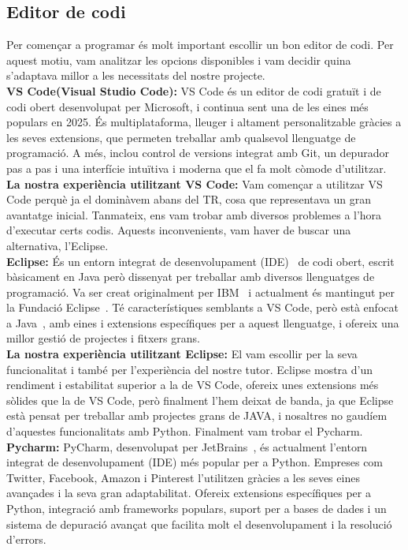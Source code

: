 \subsection{Editor de codi}
Per començar a programar és molt important escollir un bon editor de codi. Per aquest motiu, vam analitzar les opcions disponibles i vam decidir quina s’adaptava millor a les necessitats del nostre projecte.\\

\textbf{VS Code(Visual Studio Code): }
VS Code és un editor de codi gratuït i de codi obert desenvolupat per Microsoft, i continua sent una de les eines més populars en 2025. És multiplataforma, lleuger i altament personalitzable gràcies a les seves extensions, que permeten treballar amb qualsevol llenguatge de programació. A més, inclou control de versions integrat amb Git, un depurador pas a pas i una interfície intuïtiva i moderna que el fa molt còmode d’utilitzar.\\

\textbf{La nostra experiència utilitzant VS Code:}
Vam començar a utilitzar VS Code perquè ja el dominàvem abans del TR, cosa que representava un gran avantatge inicial. Tanmateix, ens vam trobar amb diversos problemes a l'hora d'executar certs codis. Aquests inconvenients, vam haver de buscar una alternativa, l'Eclipse.\\

\textbf{Eclipse: }
És un entorn integrat de desenvolupament (IDE)~\cite{IDE} de codi obert, escrit bàsicament en Java però dissenyat per treballar amb diversos llenguatges de programació. Va ser creat originalment per IBM~\cite{IBM_} i actualment és mantingut per la Fundació Eclipse~\cite{Fundation}. Té característiques semblants a VS Code, però està enfocat a Java~\cite{JAVA}, amb eines i extensions específiques per a aquest llenguatge, i ofereix una millor gestió de projectes i fitxers grans.\\

\textbf{La nostra experiència utilitzant Eclipse:}
El vam escollir per la seva funcionalitat i també per l'experiència del nostre tutor. Eclipse mostra d'un rendiment i estabilitat superior a la de VS Code, ofereix unes extensions més sòlides que la de VS Code, però finalment l'hem deixat de banda, ja que Eclipse està pensat per treballar amb projectes grans de JAVA, i nosaltres no gaudíem d'aquestes funcionalitats amb Python. Finalment vam trobar el Pycharm.\\
\clearpage
\textbf{Pycharm: }PyCharm, desenvolupat per JetBrains~\cite{Jet}, és actualment l’entorn integrat de desenvolupament (IDE) més popular per a Python. Empreses com Twitter, Facebook, Amazon i Pinterest l’utilitzen gràcies a les seves eines avançades i la seva gran adaptabilitat. Ofereix extensions específiques per a Python, integració amb frameworks populars, suport per a bases de dades i un sistema de depuració avançat que facilita molt el desenvolupament i la resolució d’errors.\\

